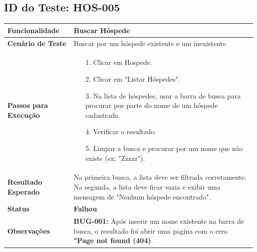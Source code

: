 \documentclass[
	12pt,				%
	openany,			%
	oneside,			%
	a4paper,			%
	english,			%
	french,				%
	spanish,			%
	brazil				%
	]{abntex2}
\begin{document}
\begin{apendicesenv}
	\subsection*{ID do Teste: HOS-005}
	\begin{tabular}{@{} p{5cm} p{11cm} @{}}
		\toprule
		\textbf{Funcionalidade} & Buscar Hóspede \\
		\midrule
		\textbf{Cenário de Teste} & Buscar por um hóspede existente e um inexistente \\
		\midrule
		\textbf{Passos para Execução} &
		\begin{itemize} \itemsep0em 
			\item[1.] Clicar em Hospede.
			\item[2.] Clicar em "Listar Hóspedes".
			\item[3.] Na lista de hóspedes, usar a barra de busca para procurar por parte do nome de um hóspede cadastrado.
			\item[4.] Verificar o resultado.
			\item[5.] Limpar a busca e procurar por um nome que não existe (ex: "Zzzzz").
		\end{itemize} \\
		\midrule
		\textbf{Resultado Esperado} & Na primeira busca, a lista deve ser filtrada corretamente. Na segunda, a lista deve ficar vazia e exibir uma mensagem de "Nenhum hóspede encontrado". \\
		\midrule
		\textbf{Status} & \textbf{Falhou} \\
		\midrule
		\textbf{Observações} &  \textbf{BUG-001:} Após inserir um nome existente na barra de busca, o resultado foi abrir uma pagina com o erro \textbf{"Page not found (404)}. \\
		\bottomrule
	\end{tabular}
	\vspace{1cm}
	

\end{apendicesenv}
\end{document}
